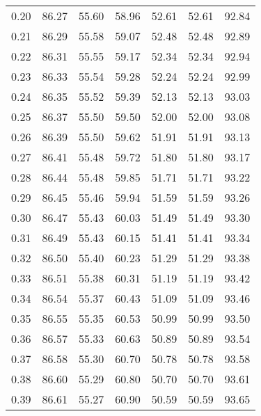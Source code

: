 \begin{tabular}{|c|c|c|c|c|c|c|}
      0.20 &     86.27 &     55.60 &      58.96 &   52.61 &      52.61 &         92.84 \\
      0.21 &     86.29 &     55.58 &      59.07 &   52.48 &      52.48 &         92.89 \\
      0.22 &     86.31 &     55.55 &      59.17 &   52.34 &      52.34 &         92.94 \\
      0.23 &     86.33 &     55.54 &      59.28 &   52.24 &      52.24 &         92.99 \\
      0.24 &     86.35 &     55.52 &      59.39 &   52.13 &      52.13 &         93.03 \\
      0.25 &     86.37 &     55.50 &      59.50 &   52.00 &      52.00 &         93.08 \\
      0.26 &     86.39 &     55.50 &      59.62 &   51.91 &      51.91 &         93.13 \\
      0.27 &     86.41 &     55.48 &      59.72 &   51.80 &      51.80 &         93.17 \\
      0.28 &     86.44 &     55.48 &      59.85 &   51.71 &      51.71 &         93.22 \\
      0.29 &     86.45 &     55.46 &      59.94 &   51.59 &      51.59 &         93.26 \\
      0.30 &     86.47 &     55.43 &      60.03 &   51.49 &      51.49 &         93.30 \\
      0.31 &     86.49 &     55.43 &      60.15 &   51.41 &      51.41 &         93.34 \\
      0.32 &     86.50 &     55.40 &      60.23 &   51.29 &      51.29 &         93.38 \\
      0.33 &     86.51 &     55.38 &      60.31 &   51.19 &      51.19 &         93.42 \\
      0.34 &     86.54 &     55.37 &      60.43 &   51.09 &      51.09 &         93.46 \\
      0.35 &     86.55 &     55.35 &      60.53 &   50.99 &      50.99 &         93.50 \\
      0.36 &     86.57 &     55.33 &      60.63 &   50.89 &      50.89 &         93.54 \\
      0.37 &     86.58 &     55.30 &      60.70 &   50.78 &      50.78 &         93.58 \\
      0.38 &     86.60 &     55.29 &      60.80 &   50.70 &      50.70 &         93.61 \\
      0.39 &     86.61 &     55.27 &      60.90 &   50.59 &      50.59 &         93.65 \\

\end{tabular}
